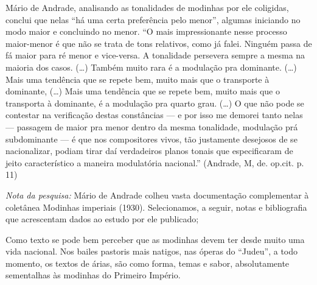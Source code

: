 Mário de Andrade, analisando as tonalidades de modinhas por ele
coligidas, conclui que nelas ``há uma certa preferência pelo menor'',
algumas iniciando no modo maior e concluindo no menor. ``O mais
impressionante nesse processo maior-menor é que não se trata de tons
relativos, como já falei. Ninguém passa de fá maior para ré menor e
vice-versa. A tonalidade persevera sempre a mesma na maioria dos casos.
(\ldots{}) Também muito rara é a modulação pra dominante. (\ldots{}) Mais uma
tendência que se repete bem, muito mais que o transporte à dominante,
(\ldots{}) Mais uma tendência que se repete bem, muito mais que o transporta
à dominante, é a modulação pra quarto grau. (\ldots{}) O que não pode se
contestar na verificação destas constâncias --- e por isso me demorei
tanto nelas --- passagem de maior pra menor dentro da mesma tonalidade,
modulação prá subdominante --- é que nos compositores vivos, tão
justamente desejosos de se nacionalizar, podiam tirar daí verdadeiros
planos tonais que especificaram de jeito característico a maneira
modulatória nacional.'' (Andrade, M, de. op.cit. p.\,11)

\emph{Nota da pesquisa:} Mário de Andrade colheu vasta documentação
complementar à coletânea Modinhas imperiais (1930). Selecionamos, a
seguir, notas e bibliografia que acrescentam dados ao estudo por ele
publicado;

Como texto se pode bem perceber que as modinhas devem ter desde muito
uma vida nacional. Nos bailes pastoris mais natigos, nas óperas do
``Judeu'', a todo momento, os textos de árias, são como forma, temas e
sabor, absolutamente sementalhas às modinhas do Primeiro Império.

